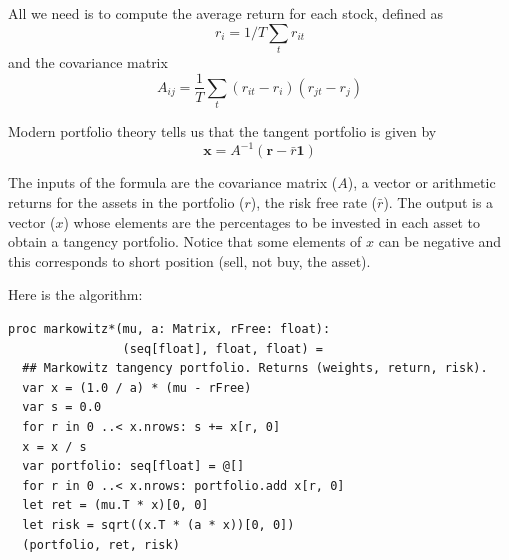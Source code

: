 \documentclass[justified, sixbynine]{tufte-book}
\def\ft{\small\tt}
\theoremstyle{plain}%
\newtheorem * {corollary}{Corollary}
\theoremstyle{definition}
\theoremstyle{remark}
\newtheorem * {remark}{Remark}
\newtheorem * {note}{Note}
\begin{document}
\begin{fullwidth}
All we need is to compute the average return for each stock, defined as
\begin{equation}
r_i = 1/T \sum_t r_{it}
\end{equation}
and the covariance matrix
\begin{equation}
A_{ij} = \frac1T \sum_t (r_{it}-r_i)(r_{jt}-r_j)
\end{equation}

Modern portfolio theory tells us that the tangent portfolio is given by
\begin{equation}
\mathbf{x}=A^{-1} ( \mathbf{r}-\bar{r}\mathbf{1})
\end{equation}

The inputs of the formula are the covariance matrix ($A$), a vector or arithmetic returns for the assets in the portfolio ($r$), the risk free rate ($\bar{r}$). The output is a vector ($x$) whose elements are the percentages to be invested in each asset to obtain a tangency portfolio. Notice that some elements of $x$ can be negative and this corresponds to short position (sell, not buy, the asset).

Here is the algorithm:

\begin{lstlisting}[caption={in file: {\ft nlib/finance.nim}}]
proc markowitz*(mu, a: Matrix, rFree: float):
                (seq[float], float, float) =
  ## Markowitz tangency portfolio. Returns (weights, return, risk).
  var x = (1.0 / a) * (mu - rFree)
  var s = 0.0
  for r in 0 ..< x.nrows: s += x[r, 0]
  x = x / s
  var portfolio: seq[float] = @[]
  for r in 0 ..< x.nrows: portfolio.add x[r, 0]
  let ret = (mu.T * x)[0, 0]
  let risk = sqrt((x.T * (a * x))[0, 0])
  (portfolio, ret, risk)
\end{lstlisting}


\end{fullwidth}
\end{document}
